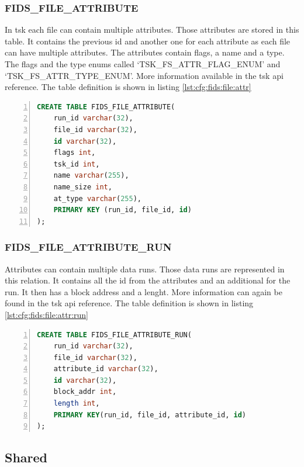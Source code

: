 \documentclass[
	a4paper,					%
	10pt,							%
	twoside,					%
	openright,				%
	notitlepage,			%
	parskip=half,			%
]{scrreprt}					%
\begin{document}
\subsubsection{FIDS\_FILE\_ATTRIBUTE}

In \gls{tsk} each file can contain multiple attributes. Those attributes are stored in this table. It contains the previous \gls{id} and another one for each attribute as each file can have multiple attributes. The attributes contain flags, a name and a type. The flags and the type enums called `TSK\_FS\_ATTR\_FLAG\_ENUM' and `TSK\_FS\_ATTR\_TYPE\_ENUM'. More information available in the \gls{tsk} \gls{api} reference. \cite{tsk:attr:struct,tsk:file:header} The table definition is shown in listing \ref{lst:cfg:fids:file:attr}

\begin{lstlisting}[language=sql, numbers=left, caption=Fids File Attribute Table Definition, label=lst:cfg:fids:file:attr]
CREATE TABLE FIDS_FILE_ATTRIBUTE(
	run_id varchar(32),
	file_id varchar(32),
	id varchar(32),
	flags int,
	tsk_id int,
	name varchar(255),
	name_size int,
	at_type varchar(255), 
	PRIMARY KEY (run_id, file_id, id)
);
\end{lstlisting}

\subsubsection{FIDS\_FILE\_ATTRIBUTE\_RUN}

Attributes can contain multiple data runs. Those data runs are represented in this relation. It contains all the \gls{id} from the attributes and an additional for the run. It then has a block address and a lenght. More information can again be found in the \gls{tsk} \gls{api} reference. \cite{tsk:attr:run:struct} The table definition is shown in listing \ref{lst:cfg:fids:file:attr:run}

\begin{lstlisting}[language=sql, numbers=left, caption=Fids File Attribute Run Table Definition, label=lst:cfg:fids:file:attr:run]
CREATE TABLE FIDS_FILE_ATTRIBUTE_RUN(
	run_id varchar(32),
	file_id varchar(32),
	attribute_id varchar(32), 
	id varchar(32), 
	block_addr int, 
	length int, 
	PRIMARY KEY(run_id, file_id, attribute_id, id) 
);
\end{lstlisting}

\subsection{Shared}
\end{document}
